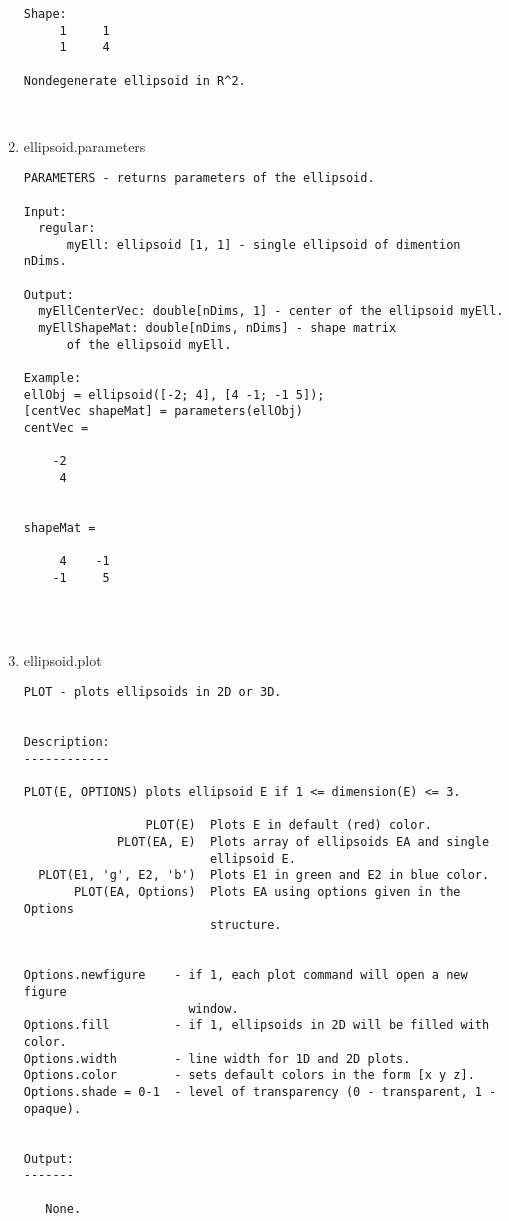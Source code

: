 \begin{enumerate}
\begin{lstlisting}
Shape:
     1     1
     1     4

Nondegenerate ellipsoid in R^2.



\end{lstlisting}
\fontfamily{\familydefault}
\selectfont
\item {ellipsoid.parameters}
\selectfont
\begin{lstlisting}
PARAMETERS - returns parameters of the ellipsoid.

Input:
  regular:
      myEll: ellipsoid [1, 1] - single ellipsoid of dimention nDims.

Output:
  myEllCenterVec: double[nDims, 1] - center of the ellipsoid myEll.
  myEllShapeMat: double[nDims, nDims] - shape matrix
      of the ellipsoid myEll.

Example:
ellObj = ellipsoid([-2; 4], [4 -1; -1 5]);
[centVec shapeMat] = parameters(ellObj)
centVec =

    -2
     4


shapeMat =

     4    -1
    -1     5




\end{lstlisting}
\fontfamily{\familydefault}
\selectfont
\item {ellipsoid.plot}
\selectfont
\begin{lstlisting}
PLOT - plots ellipsoids in 2D or 3D.


Description:
------------

PLOT(E, OPTIONS) plots ellipsoid E if 1 <= dimension(E) <= 3.

                 PLOT(E)  Plots E in default (red) color.
             PLOT(EA, E)  Plots array of ellipsoids EA and single
                          ellipsoid E.
  PLOT(E1, 'g', E2, 'b')  Plots E1 in green and E2 in blue color.
       PLOT(EA, Options)  Plots EA using options given in the Options
                          structure.


Options.newfigure    - if 1, each plot command will open a new figure
                       window.
Options.fill         - if 1, ellipsoids in 2D will be filled with color.
Options.width        - line width for 1D and 2D plots.
Options.color        - sets default colors in the form [x y z].
Options.shade = 0-1  - level of transparency (0 - transparent, 1 - opaque).


Output:
-------

   None.



\end{lstlisting}
\end{enumerate}
